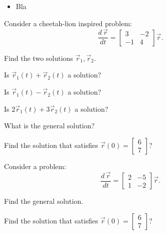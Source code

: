 \begin{lesson}

	\begin{itemize}
		\item Bla
	\end{itemize}
	

\end{lesson}




\newpage

\question
Consider a cheetah-lion inspired problem:
$$
\frac{d \,\vec{r}}{dt} = \begin{bmatrix} 3 & -2 \\ -1 & 4\end{bmatrix} \vec{r}.
$$
	
\begin{parts}
	\item Find the two solutions $\vec{r}_1, \vec{r}_2$.
	\item Is $\vec{r}_1(t) + \vec{r}_2(t)$ a solution?
	\item Is $\vec{r}_1(t) - \vec{r}_2(t)$ a solution?
	\item Is $2\vec{r}_1(t) + 3\vec{r}_2(t)$ a solution?
	\item What is the general solution?
	\item Find the solution that satisfies $\vec{r}(0) = \begin{bmatrix} 6 \\ 7\end{bmatrix}$?
\end{parts}


\bookonlynewpage


\question
Consider a problem:
$$
\frac{d \,\vec{r}}{dt} = \begin{bmatrix} 2 & -5 \\ 1 & -2\end{bmatrix} \vec{r}.
$$
	
\begin{parts}
	\item Find the general solution.
	\item Find the solution that satisfies $\vec{r}(0) = \begin{bmatrix} 6 \\ 7\end{bmatrix}$?
\end{parts}




